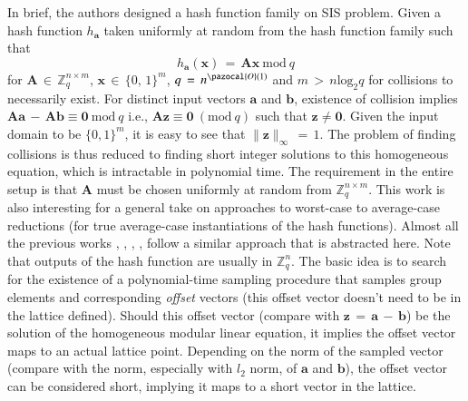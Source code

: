 \documentclass[10pt]{elsarticle}
\begin{document}
In brief, the authors \cite{CRHF_Micciancio2004} designed a hash
function family on SIS problem. Given a hash function
$h_{\mathbf{a}}$ taken uniformly at random from the hash function
family such that $$h_{\mathbf{a}}(\mathbf{x})\, =\, \mathbf{A}
\mathbf{x}~\mbox{mod}~q$$ for $\mathbf{A} \, \in \,
\mathbb{Z}_{q}^{n \times m}$, $\mathbf{x}\,\in\,\{ 0,\,1\}^{m}$, $q
\, = \, n^{\pazocal{O}(1)}$ and $m \, > \, n\mbox{log}_{2}q$ for
collisions to necessarily exist. For distinct input vectors
$\mathbf{a}$ and $\mathbf{b}$, existence of collision implies
$\mathbf{A} \mathbf{a} \, - \, \mathbf{A}
\mathbf{b}\equiv\mathbf{0}~\mbox{mod}~q$ i.e., $\mathbf{A}
\mathbf{z}\equiv\mathbf{0}~(\mbox{mod}~q)$ such that
$\mathbf{z}\neq\mathbf{0}$. Given the input domain to be $\{0,
1\}^{m}$, it is easy to see that $\parallel\mathbf{z}
\parallel_{\infty} \, = \, 1$. The problem of finding collisions is thus reduced to
finding short integer solutions to this homogeneous equation, which
is intractable in polynomial time. The requirement in the entire
setup is that $\mathbf{A}$ must be chosen uniformly at random from
$\mathbb{Z}_{q}^{n \times m}$. This work is also interesting for a
general take on approaches to worst-case to average-case reductions
(for true average-case instantiations of the hash functions). Almost
all the previous works \cite{CRHF_Ajtai1996},
\cite{CRHF_Goldreich1996}, \cite{CRHF_Cai1997}, \cite{CRHF_Regev},
\cite{CRHF_Micciancio_perfect_lattices} follow a similar approach
that is abstracted here. Note that outputs of the hash function are
usually in $\mathbb{Z}_{q}^{n}$. The basic idea is to search for the
existence of a polynomial-time sampling procedure that samples group
elements and corresponding \textit{offset} vectors (this offset
vector doesn't need to be in the lattice defined). Should this
offset vector (compare with $\mathbf{z} \, = \, \mathbf{a}\,-\,
\mathbf{b}$) be the solution of the homogeneous modular linear
equation, it implies the offset vector maps to an actual lattice
point. Depending on the norm of the sampled vector (compare with the
norm, especially with $l_{2}$ norm, of $\mathbf{a}$ and
$\mathbf{b}$), the offset vector can be considered short, implying
it maps to a short vector in the lattice.
\end{document}
